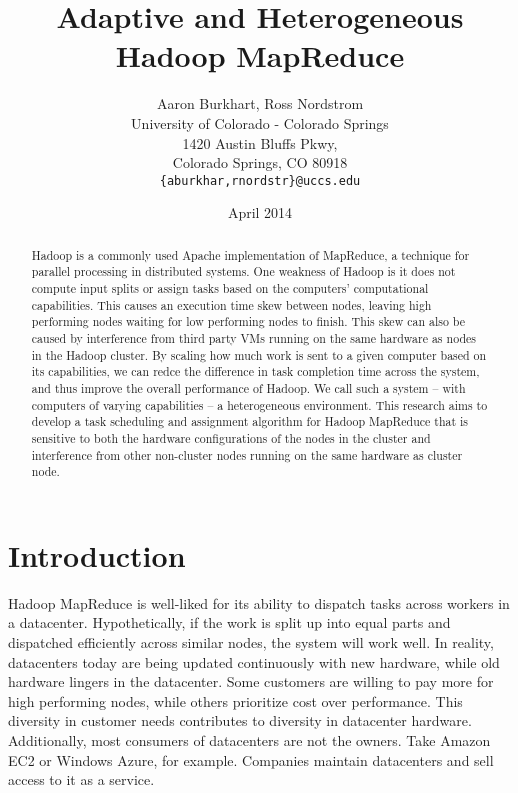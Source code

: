 \documentclass{sig-alternate}
\begin{document}
\title{Adaptive and Heterogeneous Hadoop MapReduce}
\author{Aaron Burkhart, Ross Nordstrom\\
        University of Colorado - Colorado Springs\\
        1420 Austin Bluffs Pkwy,\\
        Colorado Springs, CO 80918\\
        \texttt{\{aburkhar,rnordstr\}@uccs.edu}
       }
\date{April 2014}

\maketitle

\begin{abstract}
Hadoop is a commonly used Apache implementation of MapReduce, a technique for
parallel processing in distributed systems. One weakness of Hadoop is it does
not compute input splits or assign tasks based on the computers' computational capabilities.
This causes an execution time skew between nodes, leaving high performing nodes waiting
for low performing nodes to finish. This skew can also be caused by interference from
third party VMs running on the same hardware as nodes in the Hadoop cluster. By scaling
how much work is sent to a given computer based on its capabilities, we can
redce the difference in task completion time across the system, and thus improve
the overall performance of Hadoop. We call such a system -- with computers of
varying capabilities -- a heterogeneous environment. This research aims to develop
a task scheduling and assignment algorithm for Hadoop MapReduce that is sensitive
to both the hardware configurations of the nodes in the cluster and interference
from other non-cluster nodes running on the same hardware as cluster node.
\end{abstract}


\section{Introduction}
Hadoop MapReduce is well-liked for its ability to dispatch tasks across workers
in a datacenter. Hypothetically, if the work is split up into equal parts and dispatched
efficiently across similar nodes, the system will work well. In reality, datacenters today are being
updated continuously with new hardware, while old hardware lingers in the datacenter.
Some customers are willing to pay more for high performing nodes, while others prioritize cost over
performance. This diversity in customer needs contributes to diversity in datacenter hardware.
Additionally, most consumers of datacenters are not the owners. Take Amazon EC2
or Windows Azure, for example. Companies maintain datacenters and sell access to
it as a service.
\end{document}
